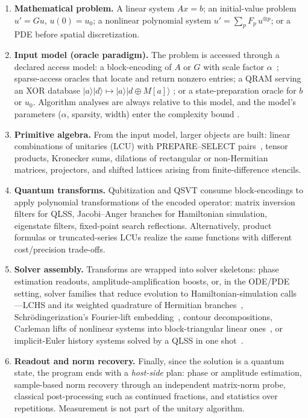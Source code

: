 \begin{enumerate}
\item \textbf{Mathematical problem.}  A linear system $Ax=b$; an initial-value
  problem $u' = G u$, $u(0)=u_0$; a nonlinear polynomial system $u' =
  \sum_p F_p\, u^{\otimes p}$; or a PDE before spatial discretization.
\item \textbf{Input model (oracle paradigm).}  The problem is accessed through
  a declared access model: a block-encoding of $A$ or $G$ with scale factor
  $\alpha$~\cite{gilyen2019qsvt}; sparse-access oracles that locate and
  return nonzero entries; a QRAM serving an XOR database
  $|a\rangle|d\rangle \mapsto |a\rangle|d \oplus M[a]\rangle$
  \cite{giovannetti2008qram}; or a state-preparation oracle for $b$ or
  $u_0$.  Algorithm analyses are always relative to this model, and the
  model's parameters ($\alpha$, sparsity, width) enter the complexity bound
  \cite{dervovic2018qlss}.
\item \textbf{Primitive algebra.}  From the input model, larger objects are
  built: linear combinations of unitaries (LCU) with PREPARE--SELECT
  pairs~\cite{berry2015taylor,low2019qubitization}, tensor products,
  Kronecker sums, dilations of rectangular or non-Hermitian matrices,
  projectors, and shifted lattices arising from finite-difference stencils.
\item \textbf{Quantum transforms.}  Qubitization and QSVT
  \cite{low2019qubitization,gilyen2019qsvt} consume block-encodings to apply
  polynomial transformations of the encoded operator: matrix inversion
  filters for QLSS, Jacobi--Anger branches for Hamiltonian simulation,
  eigenstate filters, fixed-point search reflections.  Alternatively,
  product formulas or truncated-series LCUs realize the same functions with
  different cost/precision trade-offs.
\item \textbf{Solver assembly.}  Transforms are wrapped into solver
  skeletons: phase estimation readouts, amplitude-amplification boosts, or,
  in the ODE/PDE setting, solver families that reduce evolution to
  Hamiltonian-simulation calls---LCHS and its weighted quadrature of
  Hermitian branches~\cite{an2026lchs}, Schr\"odingerization's Fourier-lift
  embedding~\cite{jin2024schrodingerization}, contour decompositions,
  Carleman lifts of nonlinear systems into block-triangular linear
  ones~\cite{liu2021pnas}, or implicit-Euler history systems solved by a QLSS
  in one shot~\cite{berry2014ode,costa2022discrete}.
\item \textbf{Readout and norm recovery.}  Finally, since the solution is a
  quantum state, the program ends with a \emph{host-side} plan: phase or
  amplitude estimation, sample-based norm recovery through an independent
  matrix-norm probe, classical post-processing such as continued fractions,
  and statistics over repetitions.  Measurement is not part of the unitary
  algorithm.
\end{enumerate}


